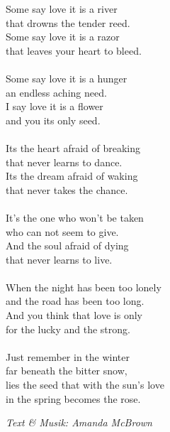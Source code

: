 \vspace{10pt}
Some say love it is a river\\
that drowns the tender reed.\\
Some say love it is a razor\\
that leaves your heart to bleed.\\
\\
Some say love it is a hunger\\
an endless aching need.\\
I say love it is a flower\\
and you its only seed.\\
\\
Its the heart afraid of breaking\\
that never learns to dance.\\
Its the dream afraid of waking\\
that never takes the chance.\\
\\
It's the one who won't be taken\\
who can not seem to give.\\
And the soul afraid of dying\\
that never learns to live.\\
\\
When the night has been too lonely\\
and the road has been too long.\\
And you think that love is only\\
for the lucky and the strong.\\
\\
Just remember in the winter\\
far beneath the bitter snow,\\
lies the seed that with the sun's love\\
in the spring becomes the rose.
\par
\vspace{10pt}
{\footnotesize\textit{Text \& Musik: Amanda McBrown}}
